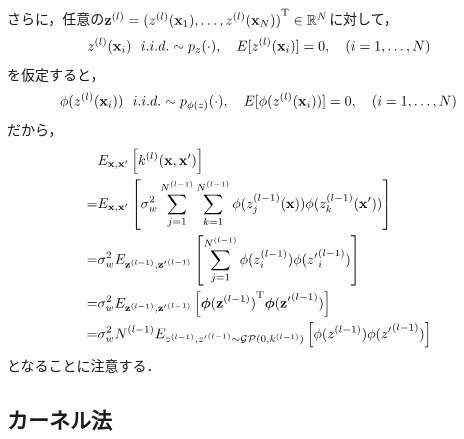 \documentclass[11pt,a4j]{article}
\begin{document}
        さらに，任意の${\bf z}^{(l)} = {(z^{(l)}({\bf x}_1), \dots, z^{(l)}({\bf x}_N))}^{\mathrm{T} } \in \mathbb{R}^{N} $に対して，
        \begin{align}
          z^{(l)}({\bf x}_i) ~~ i.i.d. \sim p_z(\cdot), ~~~ E[z^{(l)}({\bf x}_i)] = 0, ~~~ (i=1, \dots, N)
        \end{align}
        を仮定すると，
        \begin{align}
          \phi ( z^{(l)}({\bf x}_i) ) ~~ i.i.d. \sim p_{\phi(z)}(\cdot), ~~~ E[\phi( z^{(l)}({\bf x}_i) )] = 0, ~~~ (i=1, \dots, N)
        \end{align}
        だから，
        \begin{align}
           & E_{{\bf x},{\bf x}'} \left[ k^{(l)}({\bf x},{\bf x}') \right] \\
          =& E_{{\bf x},{\bf x}'} \left[ \sigma_w^2 \sum_{j=1}^{N^{(l-1)}} \sum_{k=1}^{N^{(l-1)}} \phi(z_j^{(l-1)}({\bf x})) \phi(z_k^{(l-1)}({\bf x}')) \right] \\
          =& \sigma_w^2 E_{{\bf z}^{(l-1)},{{\bf z}'}^{(l-1)}} \left[ \sum_{j=1}^{N^{(l-1)}} \phi(z_i^{(l-1)}) \phi({z'}_i^{(l-1)}) \right] \\
          =& \sigma_w^2 E_{{\bf z}^{(l-1)},{{\bf z}'}^{(l-1)}} \left[ {{\boldsymbol \phi}({\bf z}^{(l-1)})}^{\mathrm{T}} {\boldsymbol \phi}({{\bf z}'}^{(l-1)}) \right] \\
          =& \sigma_w^2 N^{(l-1)} E_{z^{(l-1)},{z'}^{(l-1)} \sim \mathcal{GP}(0, k^{(l-1)})} \left[ \phi(z^{(l-1)}) \phi({z'}^{(l-1)})  \right] 
        \end{align}
        となることに注意する．

    \subsection{カーネル法}
\end{document}
